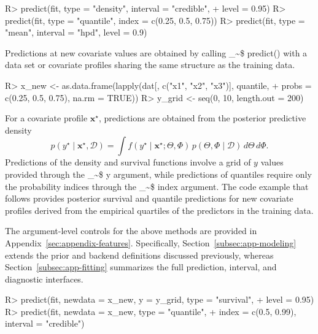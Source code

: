 \documentclass[preprint,12pt,authoryear]{elsarticle}
\makeatletter
\newcommand\code{\bgroup\@makeother\_\@makeother\~\@makeother\$\@codex}
\def\@codex#1{{\normalfont\ttfamily\hyphenchar\font=-1 #1}\egroup}
\renewenvironment{Schunk}{\vspace{0pt}}{\vspace{-0.1\baselineskip}}
\makeatother
\begin{document}
\begin{Schunk}
\begin{Sinput}
R> predict(fit, type = "density", interval = "credible",
+          level = 0.95)
R> predict(fit, type = "quantile", index = c(0.25, 0.5, 0.75))
R> predict(fit, type = "mean", interval = "hpd", level = 0.9)
\end{Sinput}
\end{Schunk}

Predictions at new covariate values are obtained by calling
\code{predict()} with a data set or covariate profiles sharing the
same structure as the training data.

\begin{Schunk}
\begin{Sinput}
R> x_new <- as.data.frame(lapply(dat[, c("x1", "x2", "x3")], quantile,
+                  probs = c(0.25, 0.5, 0.75), na.rm = TRUE))
R> y_grid <- seq(0, 10, length.out = 200)
\end{Sinput}
\end{Schunk}

For a covariate profile $\boldsymbol{x}^\star$, predictions are obtained from the
posterior predictive density
\begin{equation*}
p(y^\star\mid \boldsymbol{x}^\star, \mathcal{D})
=\int f(y^\star\mid \boldsymbol{x}^\star; \Theta, \Phi)\,p(\Theta, \Phi\mid \mathcal{D})\,d\Theta\,d\Phi.
\end{equation*}
Predictions of the density and survival functions involve a grid of $y$
values provided through the \code{y} argument, while predictions of quantiles
require only the probability indices through the \code{index} argument.
The code example that follows provides posterior survival and quantile
predictions for new covariate profiles derived from the empirical
quartiles of the predictors in the training data.

The argument-level controls for the above methods are provided in
Appendix~\ref{sec:appendix-features}. Specifically,
Section~\ref{subsec:app-modeling} extends the prior and backend
definitions discussed previously, whereas Section~\ref{subsec:app-fitting} summarizes the full prediction,
interval, and diagnostic interfaces.

\begin{Schunk}
\begin{Sinput}
R> predict(fit, newdata = x_new, y = y_grid, type = "survival",
+          level = 0.95)
R> predict(fit, newdata = x_new, type = "quantile",
+          index = c(0.5, 0.99), interval = "credible")
\end{Sinput}
\end{Schunk}
\end{document}
